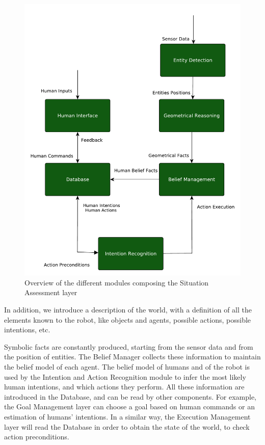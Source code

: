 \begin{figure}[ht!]
	\centering
	\includegraphics[scale=0.45]{img/situation_assessment/situation_assessment_overview}
	\caption{Overview of the different modules composing the Situation Assessment layer}
	\label{fig:situation_assessment-situation_assessment_overview}
\end{figure}

In addition, we introduce a description of the world, with a definition of all the elements known to the robot, like objects and agents, possible actions, possible intentions, etc. 

Symbolic facts are constantly produced, starting from the sensor data and from the position of entities. The Belief Manager collects these information to maintain the belief model of each agent. The belief model of humans and of the robot is used by the Intention and Action Recognition module to infer the most likely human intentions, and which actions they perform. All these information are introduced in the Database, and can be read by other components. For example, the Goal Management layer can choose a goal based on human commands or an estimation of humans' intentions. In a similar way, the Execution Management layer will read the Database in order to obtain the state of the world, to check action preconditions.  

